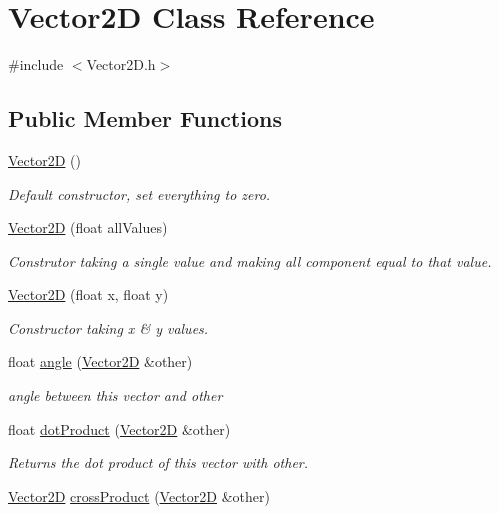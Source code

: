 \hypertarget{class_vector2_d}{\section{Vector2\-D Class Reference}
\label{class_vector2_d}
}


{\ttfamily \#include $<$Vector2\-D.\-h$>$}

\subsection*{Public Member Functions}
\begin{DoxyCompactItemize}
\item 
\hypertarget{class_vector2_d_a98e9997ebb7a629f4db52397d4e0d653}{\hyperlink{class_vector2_d_a98e9997ebb7a629f4db52397d4e0d653}{Vector2\-D} ()}\label{class_vector2_d_a98e9997ebb7a629f4db52397d4e0d653}

\begin{DoxyCompactList}\small\item\em Default constructor, set everything to zero. \end{DoxyCompactList}\item 
\hyperlink{class_vector2_d_ab32b5621c9d3b67d506aa3170a789259}{Vector2\-D} (float all\-Values)
\begin{DoxyCompactList}\small\item\em Construtor taking a single value and making all component equal to that value. \end{DoxyCompactList}\item 
\hyperlink{class_vector2_d_a166ca1df158a260a7cbf3b57ff147a4a}{Vector2\-D} (float x, float y)
\begin{DoxyCompactList}\small\item\em Constructor taking x \& y values. \end{DoxyCompactList}\item 
float \hyperlink{class_vector2_d_a4cbde94a1519f61733c607967fa39084}{angle} (\hyperlink{class_vector2_d}{Vector2\-D} \&other)
\begin{DoxyCompactList}\small\item\em angle between this vector and other \end{DoxyCompactList}\item 
float \hyperlink{class_vector2_d_a4b4331ddc82ab81b6e5a66bd861cb315}{dot\-Product} (\hyperlink{class_vector2_d}{Vector2\-D} \&other)
\begin{DoxyCompactList}\small\item\em Returns the dot product of this vector with other. \end{DoxyCompactList}\item 
\hypertarget{class_vector2_d_a007279b304311011d2dc60e940060d30}{\hyperlink{class_vector2_d}{Vector2\-D} \hyperlink{class_vector2_d_a007279b304311011d2dc60e940060d30}{cross\-Product} (\hyperlink{class_vector2_d}{Vector2\-D} \&other)}\label{class_vector2_d_a007279b304311011d2dc60e940060d30}


\end{DoxyCompactItemize}
